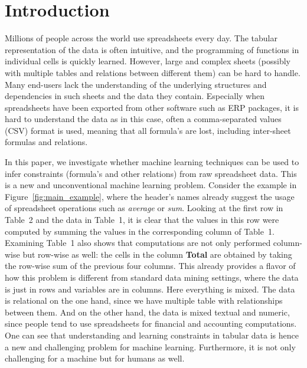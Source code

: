 \documentclass{sig-alternate-05-2015}
\begin{document}
\section{Introduction}
Millions of people across the world use spreadsheets every day. The tabular representation of the data is often intuitive, and the programming of functions in individual cells is quickly learned. However, large and complex sheets (possibly with multiple tables and relations between different them) can be hard to handle. Many end-users lack the understanding of the underlying structures and dependencies in such sheets and the data they contain. Especially when spreadsheets have been exported from
other software such as ERP packages, it is hard to understand the data as in this case,
often a comma-separated values (CSV) format is used, meaning that all formula's are lost, including inter-sheet formulas and relations.

In this paper,  we investigate whether machine learning techniques can be used to infer constraints (formula's and other relations) from raw spreadsheet data.
This is a new and unconventional machine learning problem.
Consider the example in Figure~\ref{fig:main_example}, where the header's names already suggest the usage of spreadsheet operations such as \textit{average} or \textit{sum}.
Looking at the first row in Table~2 and the data in Table~1, it is clear that the values in this row were computed by summing the values in the corresponding column of Table~1.
Examining Table~1 also shows that computations are not only performed column-wise but row-wise as well: the cells in the column \textbf{Total} are obtained by taking the row-wise sum of the previous four columns.
This already provides a flavor of how this problem is different from standard data mining settings, where the data is just in rows and variables are in columns. Here everything is mixed. The data is relational on the one hand, since we have multiple table with relationships between them. And on the other hand, the data is mixed textual and numeric, since people tend to use spreadsheets for financial and accounting computations. One can see that understanding and learning constraints in tabular data is hence a new and challenging problem for machine learning. Furthermore, it is not only challenging for a machine but for humans as well.
\end{document}
